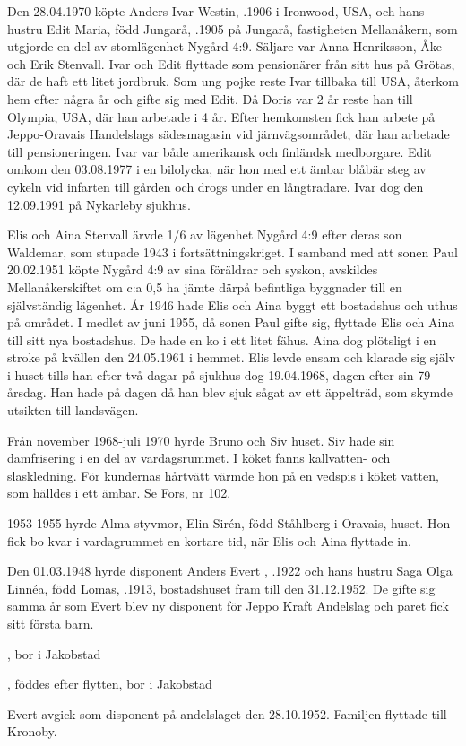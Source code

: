 Den 28.04.1970 köpte Anders Ivar Westin, .1906 i Ironwood, USA, och hans hustru Edit Maria, född Jungarå, .1905 	på Jungarå,	fastigheten Mellanåkern, som utgjorde en del av stomlägenhet Nygård 4:9. Säljare var Anna Henriksson, Åke och Erik Stenvall. Ivar och Edit flyttade som pensionärer från sitt hus på Grötas, där de haft ett litet jordbruk. Som ung pojke reste Ivar tillbaka till USA, återkom hem efter några år och gifte sig med Edit. Då Doris var 2 år reste han till Olympia, USA, där han arbetade i 4 år. Efter hemkomsten fick han arbete på Jeppo-Oravais Handelslags sädesmagasin vid järnvägsområdet, där han arbetade till pensioneringen. Ivar var både amerikansk och finländsk medborgare. Edit omkom den 03.08.1977 i en bilolycka, när hon med ett ämbar blåbär steg av cykeln vid infarten till gården och drogs under en långtradare. Ivar dog den 12.09.1991 på Nykarleby sjukhus.


Elis och Aina Stenvall ärvde 1/6 av lägenhet Nygård 4:9 efter deras son Waldemar, som stupade 1943 i fortsättningskriget. I samband med att sonen Paul 20.02.1951 köpte Nygård 4:9 av sina föräldrar och syskon, avskildes Mellanåkerskiftet om c:a 0,5 ha jämte därpå befintliga byggnader till en självständig lägenhet. År 1946 hade Elis och Aina byggt ett bostadshus och uthus på området. I medlet av juni 1955, då sonen Paul gifte sig, flyttade Elis och Aina till sitt nya bostadshus. De hade en ko i ett litet fähus. Aina dog plötsligt i en stroke på kvällen den 	24.05.1961 i hemmet. Elis levde ensam och klarade sig själv i huset tills han efter två dagar på sjukhus dog 19.04.1968, dagen efter sin 79-årsdag. Han hade på dagen då han blev sjuk sågat av ett äppelträd, som skymde utsikten till landsvägen.



Från november 1968-juli 1970 hyrde Bruno och Siv  huset. Siv hade sin damfrisering i en del av vardagsrummet. I köket fanns kallvatten- och slaskledning. För kundernas hårtvätt värmde hon på en	vedspis i köket vatten, som hälldes i ett ämbar. Se Fors, nr 102.

1953-1955 hyrde Alma  styvmor, Elin Sirén, född Ståhlberg i Oravais, huset. Hon fick bo kvar i vardagrummet en kortare tid, när Elis och Aina flyttade in.

Den 01.03.1948 hyrde disponent Anders Evert , .1922 och hans hustru Saga Olga Linnéa, född Lomas, .1913, bostadshuset fram till den 31.12.1952. De gifte sig samma år som Evert blev ny disponent för Jeppo Kraft Andelslag och paret fick sitt första barn.
\begin{jhchildren}
  \item {}, bor i Jakobstad
  \item {}, föddes efter flytten, bor i Jakobstad
\end{jhchildren}
Evert avgick som disponent på andelslaget den 28.10.1952. Familjen flyttade till Kronoby.



